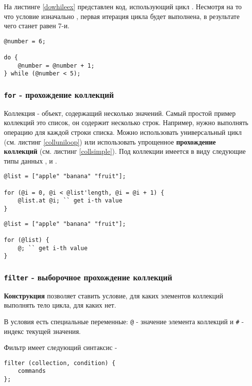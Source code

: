 \documentclass[a4paper, 14pt]{extarticle}
\begin{document}
На листинге \ref{dowhileex} представлен код, использующий цикл . Несмотря на то что условие изначально , первая итерация цикла будет выполнена, в результате чего  станет равен 7-и.

\begin{lstlisting}[caption=Цикл do while, label=dowhileex]
@number = 6;

do {
	@number = @number + 1;
} while (@number < 5);
\end{lstlisting}

\subsubsection{\lstinline`for` - прохождение коллекций}

{Коллекция} - объект, содержащий несколько значений. Самый простой пример коллекций это список, он содержит несколько строк. Например, нужно выполнять операцию для каждой строки списка. Можно использовать универсальный цикл (см. листинг \ref{colluniloop}) или использовать упрощенное {\bf прохождение коллекций} (см. листинг \ref{collsimple}). Под коллекции имеется в виду следующие типы данных ,  и .
\begin{lstlisting}[caption=Прохождение коллекций с помощью универсального цикла, label=colluniloop]
@list = ["apple" "banana" "fruit"];

for (@i = 0, @i < @list'length, @i = @i + 1) {
	@list.at @i; `` get i-th value
}
\end{lstlisting}

\begin{lstlisting}[caption=Упрощённое прохождение коллекций, label=collsimple]
@list = ["apple" "banana" "fruit"];

for (@list) {
	@; `` get i-th value
}
\end{lstlisting}

\subsubsection{\lstinline`filter` - выборочное прохождение коллекций}

{\bf Конструкция } позволяет ставить условие, для каких элементов коллекций выполнять тело цикла, для каких нет.

В условия есть специальные переменные: \lstinline|@| - значение элемента коллекций и \lstinline|#| - индекс текущей значения.

Фильтр имеет следующий синтаксис -
\begin{lstlisting}[numbers=none]
filter (collection, condition) {
	commands
};
\end{lstlisting}
\end{document}
